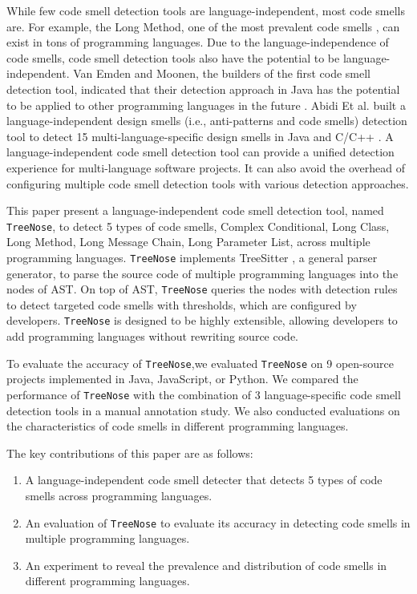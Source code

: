 While few code smell detection tools are language-independent, most code smells are. For example, the Long Method, one of the most prevalent code smells \cite{developersCare}, can exist in tons of programming languages.
Due to the language-independence of code smells, code smell detection tools also have the potential to be language-independent.
Van Emden and Moonen, the builders of the first code smell detection tool, indicated that their detection
approach in Java has the potential to be applied to other programming languages in the future \cite{1173068}.
Abidi Et al. built a language-independent design smells (i.e., anti-patterns and code smells) detection tool to detect 15 multi-language-specific
design smells in Java and C/C++ \cite{MultiLanguageCodeSmells} \cite{Fault-Prone}. A language-independent code smell detection tool can
provide a unified detection experience for multi-language software projects. It can also avoid the overhead 
of configuring multiple code smell detection tools with various detection approaches.

This paper present a language-independent code smell detection tool, named \texttt{TreeNose}, to detect 5 types of code smells, Complex Conditional, 
Long Class, Long Method, Long Message Chain, Long Parameter List, across multiple programming languages.
\texttt{TreeNose} implements TreeSitter \cite{treeSitter}, a general parser generator,
to parse the source code of multiple programming languages into the nodes of AST. On top of AST, \texttt{TreeNose} queries the nodes with detection rules to detect targeted code smells with thresholds, which are configured by developers.
\texttt{TreeNose} is designed to be highly extensible, allowing developers to add programming languages without rewriting source code.
  
To evaluate the accuracy of \texttt{TreeNose},we evaluated \texttt{TreeNose} on 9 open-source projects
implemented in Java, JavaScript, or Python. We compared the performance of \texttt{TreeNose} with the combination of 3 language-specific code smell detection tools 
in a manual annotation study.
We also conducted evaluations on the characteristics 
of code smells in different programming languages. 

The key contributions of this paper are as follows:

\begin{enumerate}
    \item A language-independent code smell detecter that detects 5 types of code smells across programming languages.
    \item An evaluation of \texttt{TreeNose} to evaluate its accuracy in detecting code smells in multiple programming languages.
    \item An experiment to reveal the prevalence and distribution of code smells in different programming languages.
\end{enumerate}

